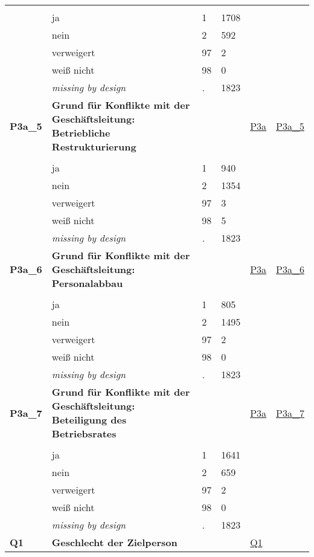 \begin{longtable}{| L{2.45cm} | L{6cm} | C{1.5cm} | R{1cm} | C{2.25cm} | C{2.25cm} |}
   &  &  &  &  &  \\ 
   & ja & 1 & 1708 &  &  \\ 
   & nein & 2 & 592 &  &  \\ 
   & verweigert & 97 & 2 &  &  \\ 
   & weiß nicht & 98 & 0 &  &  \\ 
   & \textit{missing by design} & \textit{.} & 1823 &  &  \\ 
   \midrule
\textbf{P3a\_5}\label{var:P3a:5} & \textbf{Grund für Konflikte mit der Geschäftsleitung: Betriebliche Restrukturierung} &  &  & \hyperref[P3a]{P3a} & \hyperref[var:suf:P3a:5]{P3a\_5} \\ 
   &  &  &  &  &  \\ 
   & ja & 1 & 940 &  &  \\ 
   & nein & 2 & 1354 &  &  \\ 
   & verweigert & 97 & 3 &  &  \\ 
   & weiß nicht & 98 & 5 &  &  \\ 
   & \textit{missing by design} & \textit{.} & 1823 &  &  \\ 
   \midrule
\textbf{P3a\_6}\label{var:P3a:6} & \textbf{Grund für Konflikte mit der Geschäftsleitung: Personalabbau} &  &  & \hyperref[P3a]{P3a} & \hyperref[var:suf:P3a:6]{P3a\_6} \\ 
   &  &  &  &  &  \\ 
   & ja & 1 & 805 &  &  \\ 
   & nein & 2 & 1495 &  &  \\ 
   & verweigert & 97 & 2 &  &  \\ 
   & weiß nicht & 98 & 0 &  &  \\ 
   & \textit{missing by design} & \textit{.} & 1823 &  &  \\ 
   \midrule
\textbf{P3a\_7}\label{var:P3a:7} & \textbf{Grund für Konflikte mit der Geschäftsleitung: Beteiligung des Betriebsrates} &  &  & \hyperref[P3a]{P3a} & \hyperref[var:suf:P3a:7]{P3a\_7} \\ 
   &  &  &  &  &  \\ 
   & ja & 1 & 1641 &  &  \\ 
   & nein & 2 & 659 &  &  \\ 
   & verweigert & 97 & 2 &  &  \\ 
   & weiß nicht & 98 & 0 &  &  \\ 
   & \textit{missing by design} & \textit{.} & 1823 &  &  \\ 
   \midrule
\textbf{Q1}\label{var:Q1} & \textbf{Geschlecht der Zielperson} &  &  & \hyperref[Q1]{Q1} & \hyperref[var:suf:]{} \\ 

\end{longtable}
